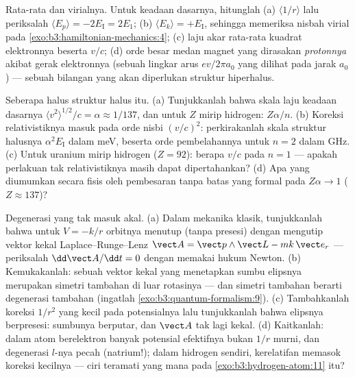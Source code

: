 \begin{exercise}[$\star\star\star$]\label{exo:b3:hydrogen-atom:10}
Rata-rata dan virialnya. Untuk keadaan dasarnya, hitunglah (a)
$\langle 1/r\rangle$ lalu periksalah $\langle E_p\rangle = -2E_{\text{I}}
= 2E_1$; (b) $\langle E_k\rangle = +E_{\text{I}}$, sehingga memeriksa
nisbah virial pada \cref{exo:b3:hamiltonian-mechanics:4}; (c) laju akar
rata-rata kuadrat elektronnya beserta $v/c$; (d) orde besar medan magnet yang dirasakan
\emph{protonnya} akibat gerak elektronnya (sebuah lingkar arus
$ev/2\pi a_0$ yang dilihat pada jarak $a_0$) --- sebuah bilangan yang
akan diperlukan struktur hiperhalus.
\end{exercise}

\begin{exercise}[$\star\star\star$]\label{exo:b3:hydrogen-atom:11}
Seberapa halus struktur halus itu. (a) Tunjukkanlah bahwa skala laju
keadaan dasarnya $\langle v^2\rangle^{1/2}/c = \alpha \approx 1/137$, dan
untuk $Z$ mirip hidrogen: $Z\alpha/n$. (b) Koreksi relativistiknya masuk
pada orde nisbi $(v/c)^2$: perkirakanlah skala struktur halusnya
$\alpha^2E_{\text{I}}$ dalam meV, beserta orde pembelahannya untuk
$n = 2$ dalam GHz. (c) Untuk uranium mirip hidrogen ($Z = 92$): berapa
$v/c$ pada $n = 1$ --- apakah perlakuan tak relativistiknya masih dapat
dipertahankan? (d) Apa yang diumumkan secara fisis oleh pembesaran tanpa
batas yang formal pada $Z\alpha \to 1$ ($Z \approx 137$)?
\end{exercise}

\begin{exercise}[$\star\star\star$]\label{exo:b3:hydrogen-atom:12}
Degenerasi yang tak masuk akal. (a) Dalam mekanika klasik, tunjukkanlah
bahwa untuk $V = -k/r$ orbitnya menutup (tanpa presesi) dengan mengutip
vektor kekal Laplace--Runge--Lenz $\vect A = \vect p\wedge\vect
L - mk\,\vect e_r$ --- periksalah $\dd\vect A/\dd t = 0$ dengan memakai
hukum Newton. (b) Kemukakanlah: sebuah vektor kekal yang menetapkan
sumbu elipsnya merupakan simetri tambahan di luar rotasinya --- dan
simetri tambahan berarti degenerasi tambahan (ingatlah
\cref{exo:b3:quantum-formalism:9}). (c) Tambahkanlah koreksi $1/r^2$
yang kecil pada potensialnya lalu tunjukkanlah bahwa elipsnya
berpresesi: sumbunya berputar, dan $\vect A$ tak lagi kekal. (d)
Kaitkanlah: dalam atom berelektron banyak potensial efektifnya bukan
$1/r$ murni, dan degenerasi $l$-nya pecah (natrium!); dalam hidrogen
sendiri, kerelatifan memasok koreksi kecilnya --- ciri teramati yang
mana pada \cref{exo:b3:hydrogen-atom:11} itu?
\end{exercise}

